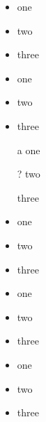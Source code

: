\documentclass{article}
\begin{document}
\begin{itemize}
	\item one
	\item two
	\item three
\end{itemize}
\begin{itemize}[label=\textcolor{blue}{$\blacktriangle$}]
	\item one
	\item two
	\item three
\end{itemize}
\begin{itemize}
	\item[a] one
	\item[?] two
	\item[] three
\end{itemize}
\begin{itemize}
	\huge
	\item one
	\LARGE
	\item two
	\tiny
	\item three
\end{itemize}
\begin{itemize}[label=\raisebox{0.25ex}{\tiny$\bullet$}]
	\item one
	\item two
	\item three
\end{itemize}
\begin{itemize}
	\fontsize{30}{1cm}\selectfont
	\item one
	\item two
	\item three
	\end{itemize}
\end{document}
